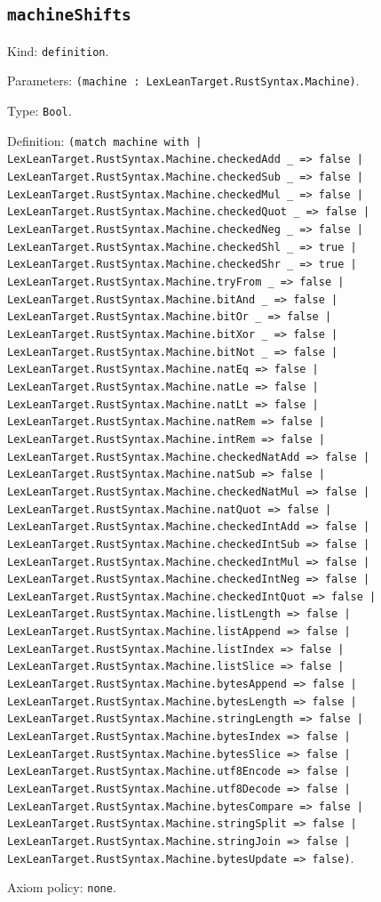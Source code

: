\documentclass[11pt]{article}
\begin{document}
\subsection*{\texttt{machineShifts}}
\noindent Kind: \texttt{definition}.\par
\noindent Parameters: \texttt{(machine : LexLeanTarget.RustSyntax.Machine)}.\par
\noindent Type: \texttt{Bool}.\par
\noindent Definition: \texttt{(match machine with | LexLeanTarget.RustSyntax.Machine.checkedAdd \_ => false | LexLeanTarget.RustSyntax.Machine.checkedSub \_ => false | LexLeanTarget.RustSyntax.Machine.checkedMul \_ => false | LexLeanTarget.RustSyntax.Machine.checkedQuot \_ => false | LexLeanTarget.RustSyntax.Machine.checkedNeg \_ => false | LexLeanTarget.RustSyntax.Machine.checkedShl \_ => true | LexLeanTarget.RustSyntax.Machine.checkedShr \_ => true | LexLeanTarget.RustSyntax.Machine.tryFrom \_ => false | LexLeanTarget.RustSyntax.Machine.bitAnd \_ => false | LexLeanTarget.RustSyntax.Machine.bitOr \_ => false | LexLeanTarget.RustSyntax.Machine.bitXor \_ => false | LexLeanTarget.RustSyntax.Machine.bitNot \_ => false | LexLeanTarget.RustSyntax.Machine.natEq => false | LexLeanTarget.RustSyntax.Machine.natLe => false | LexLeanTarget.RustSyntax.Machine.natLt => false | LexLeanTarget.RustSyntax.Machine.natRem => false | LexLeanTarget.RustSyntax.Machine.intRem => false | LexLeanTarget.RustSyntax.Machine.checkedNatAdd => false | LexLeanTarget.RustSyntax.Machine.natSub => false | LexLeanTarget.RustSyntax.Machine.checkedNatMul => false | LexLeanTarget.RustSyntax.Machine.natQuot => false | LexLeanTarget.RustSyntax.Machine.checkedIntAdd => false | LexLeanTarget.RustSyntax.Machine.checkedIntSub => false | LexLeanTarget.RustSyntax.Machine.checkedIntMul => false | LexLeanTarget.RustSyntax.Machine.checkedIntNeg => false | LexLeanTarget.RustSyntax.Machine.checkedIntQuot => false | LexLeanTarget.RustSyntax.Machine.listLength => false | LexLeanTarget.RustSyntax.Machine.listAppend => false | LexLeanTarget.RustSyntax.Machine.listIndex => false | LexLeanTarget.RustSyntax.Machine.listSlice => false | LexLeanTarget.RustSyntax.Machine.bytesAppend => false | LexLeanTarget.RustSyntax.Machine.bytesLength => false | LexLeanTarget.RustSyntax.Machine.stringLength => false | LexLeanTarget.RustSyntax.Machine.bytesIndex => false | LexLeanTarget.RustSyntax.Machine.bytesSlice => false | LexLeanTarget.RustSyntax.Machine.utf8Encode => false | LexLeanTarget.RustSyntax.Machine.utf8Decode => false | LexLeanTarget.RustSyntax.Machine.bytesCompare => false | LexLeanTarget.RustSyntax.Machine.stringSplit => false | LexLeanTarget.RustSyntax.Machine.stringJoin => false | LexLeanTarget.RustSyntax.Machine.bytesUpdate => false)}.\par
\noindent Axiom policy: \texttt{none}.\par
\end{document}
